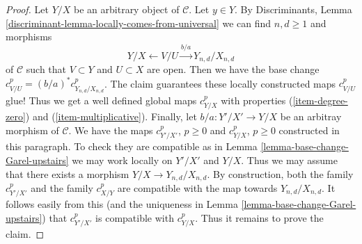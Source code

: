 \begin{proof}
\medskip\noindent
Let $Y/X$ be an arbitrary object of $\mathcal{C}$. Let $y \in Y$.
By Discriminants, Lemma \ref{discriminant-lemma-locally-comes-from-universal}
we can find $n, d \geq 1$ and morphisms
$$
Y/X \leftarrow V/U \xrightarrow{b/a} Y_{n, d}/X_{n, d}
$$
of $\mathcal{C}$ such that $V \subset Y$ and $U \subset X$ are open.
Then we have the base change $c^p_{V/U} = (b/a)^*c^p_{Y_{n, d}/X_{n, d}}$.
The claim guarantees these locally constructed maps $c^p_{V/U}$ glue!
Thus we get a well defined global maps $c^p_{Y/X}$ with properties
(\ref{item-degree-zero}) and (\ref{item-multiplicative}).
Finally, let $b/a : Y'/X' \to Y/X$ be an arbitray morphism of $\mathcal{C}$.
We have the maps $c^p_{Y'/X'}$, $p \geq 0$ and $c^p_{Y/X}$, $p \geq 0$
constructed in this paragraph. To check they are compatible as in
Lemma \ref{lemma-base-change-Garel-upstairs} we may work locally
on $Y'/X'$ and $Y/X$. Thus we may assume that there exists a morphism
$Y/X \to Y_{n, d}/X_{n, d}$. By construction, both the family
$c^p_{Y'/X'}$ and the family $c^p_{X/Y}$ are compatible with
the map towards $Y_{n, d}/X_{n, d}$. It follows easily from this
(and the uniqueness in Lemma \ref{lemma-base-change-Garel-upstairs})
that $c^p_{Y'/X'}$ is compatible with $c^p_{Y/X}$.
Thus it remains to prove the claim.


\end{proof}
